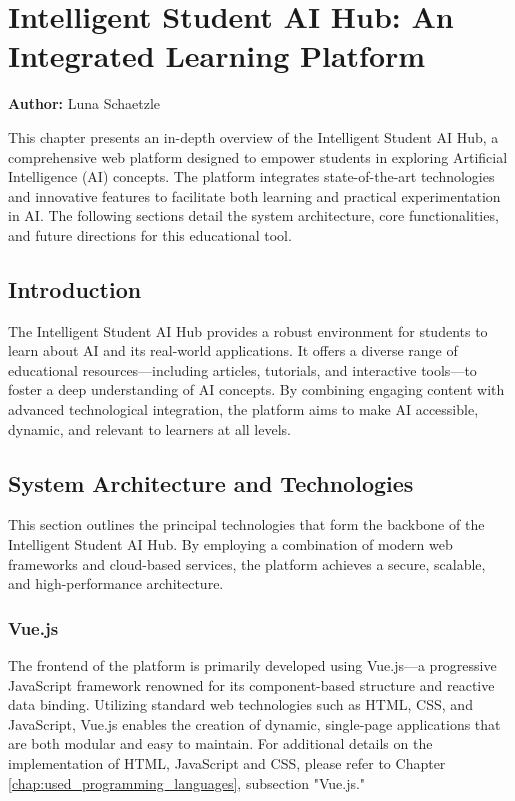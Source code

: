 \chapter{Intelligent Student AI Hub: An Integrated Learning Platform} 
\label{chap:Student_AI_Hub}
\textbf{Author:} Luna Schaetzle

This chapter presents an in-depth overview of the Intelligent Student AI Hub, 
a comprehensive web platform designed to empower students in exploring Artificial Intelligence (AI) concepts. 
The platform integrates state-of-the-art technologies and innovative features to facilitate both learning and practical experimentation in AI. 
The following sections detail the system architecture, core functionalities, and future directions for this educational tool.

\section{Introduction}

The Intelligent Student AI Hub provides a robust environment for students to learn about AI and its real-world applications. 
It offers a diverse range of educational resources—including articles, tutorials, and interactive tools—to foster a deep understanding of AI concepts. 
By combining engaging content with advanced technological integration, the platform aims to make AI accessible, dynamic, and relevant to learners at all levels.

\section{System Architecture and Technologies}

This section outlines the principal technologies that form the backbone of the Intelligent Student AI Hub. By employing a combination of modern web frameworks and cloud-based services, the platform achieves a secure, scalable, and high-performance architecture.

\subsection{Vue.js}


The frontend of the platform is primarily developed using Vue.js—a progressive JavaScript framework renowned for its component-based structure and reactive data binding. Utilizing standard web technologies such as HTML, CSS, and JavaScript, Vue.js enables the creation of dynamic, single-page applications that are both modular and easy to maintain. For additional details on the implementation of HTML, JavaScript and CSS, please refer to Chapter \ref{chap:used_programming_languages}, subsection "Vue.js."

